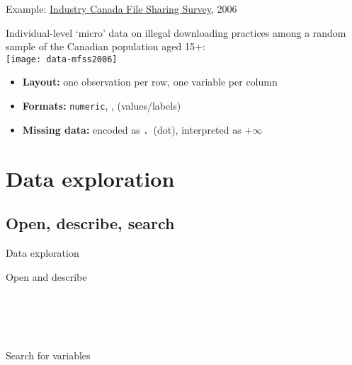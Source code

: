 \documentclass[t]{beamer}
\begin{document}
	\begin{frame}[t]{Example: \href{http://www.ic.gc.ca/eic/site/ic1.nsf/eng/01464.html}{Industry Canada File Sharing Survey}, 2006}

	Individual-level `micro' data on illegal downloading practices among a random sample of the Canadian population aged 15+:\\[1em]
	
	\texttt{[image: data-mfss2006]}\\[.5em]

  \begin{itemize}
    \item \textbf{Layout:} one observation per row, one variable per column
    \item \textbf{Formats:} \texttt{numeric}, ,  \color{fg} (values/labels) 
    \item \textbf{Missing data:} encoded as \texttt{.}~(dot), interpreted as $+\infty$
  \end{itemize}    
 	
	\end{frame}

	\section{Data exploration}
 
	\subsection{Open, describe, search}

	\begin{frame}[t]{Data exploration}
		
	  \begin{block}{Open and describe}
	  	\\
		  \\
	  
	    \\
	    \\
	  	    
	    \\
	  \end{block}
	  
	  \begin{block}{Search for variables}
			\\
	  	\\
	  		  
	  	\\
	  \end{block}
	  
	\end{frame}
  		
\end{document}
